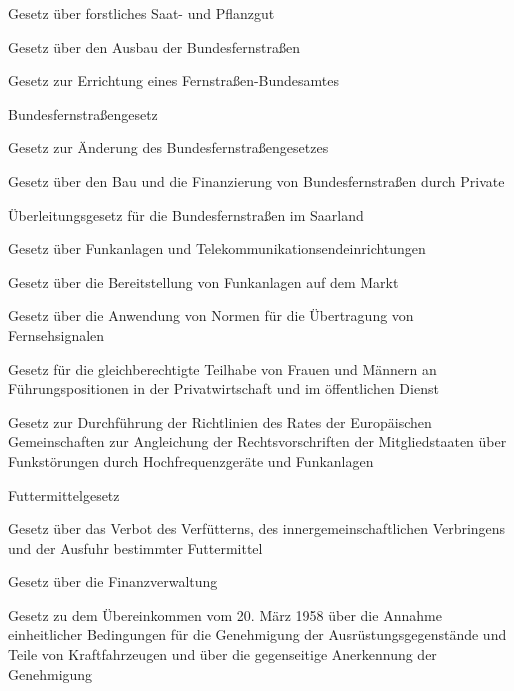 \item[{FSaatG}] Gesetz über forstliches Saat- und Pflanzgut

\item[{FStrAusbauG}] Gesetz über den Ausbau der Bundesfernstraßen

\item[{FStrBAG}] Gesetz zur Errichtung eines Fernstraßen-Bundesamtes

\item[{FStrG}] Bundesfernstraßengesetz

\item[{FStrGÄndG}] Gesetz zur Änderung des Bundesfernstraßengesetzes

\item[{FStrPrivFinG}] Gesetz über den Bau und die Finanzierung von Bundesfernstraßen durch Private

\item[{FStrSaarÜblG}] Überleitungsgesetz für die Bundesfernstraßen im Saarland

\item[{FTEG}] Gesetz über Funkanlagen und Telekommunikationsendeinrichtungen

\item[{FuAG}] Gesetz über die Bereitstellung von Funkanlagen auf dem Markt

\item[{FÜG}] Gesetz über die Anwendung von Normen für die Übertragung von Fernsehsignalen

\item[{FührposGleichberG}] Gesetz für die gleichberechtigte Teilhabe von Frauen und Männern an Führungspositionen in der Privatwirtschaft und im öffentlichen Dienst

\item[{FunkStörG}] Gesetz zur Durchführung der Richtlinien des Rates der Europäischen Gemeinschaften zur Angleichung der Rechtsvorschriften der Mitgliedstaaten über Funkstörungen durch Hochfrequenzgeräte und Funkanlagen

\item[{FuttMG}] Futtermittelgesetz

\item[{FuttMVerbotG}] Gesetz über das Verbot des Verfütterns, des innergemeinschaftlichen Verbringens und der Ausfuhr bestimmter Futtermittel

\item[{FVG-1971}] Gesetz über die Finanzverwaltung

\item[{FzgTeilÜbkG}] Gesetz zu dem Übereinkommen vom 20. März 1958 über die Annahme einheitlicher Bedingungen für die Genehmigung der Ausrüstungsgegenstände und Teile von Kraftfahrzeugen und über die gegenseitige Anerkennung der Genehmigung

